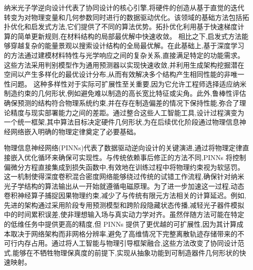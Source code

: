 纳米光子学逆向设计代表了协同设计的核心引擎,将硬件的创造从基于直觉的迭代转变为对物理变量和几何参数同时进行的数据驱动优化。该领域的基础方法包括拓扑优化和启发式方法,它们提供了不同的算法优势。拓扑优化利用基于快速梯度计算的简单更新规则,在材料结构的局部最优解中快速收敛。\citep{doi_10_1115_1_4065902_bf83da4b} \citep{doi_10_32604_cmes_2024_052620_6f4a92ee} 相比之下,启发式方法能够穿越复杂的能量景观以搜索设计结构的全局最优解。在此基础上,基于深度学习的方法通过建模材料特性与光学响应之间的复杂关系,直接满足特定的功能需求。这些方法采用判别模型作为通用预测器以实现快速收敛,并利用生成架构挖掘潜在空间以产生多样化的最优设计分布,从而有效解决多个结构产生相同性能的非唯一性问题。\citep{doi_10_1364_cleo_at_2024_jth2a_48_87abd6b5} 这种多样性对于实际可扩展性至关重要,因为它允许工程师选择适应纳米制造约束的几何形状,例如避免难以制造的高长宽比特征或尖角。此外,鲁棒性评估确保预测的结构符合物理系统约束,并在存在制造偏差的情况下保持性能,弥合了理论精度与现实部署能力之间的差距。通过整合这些人工智能工具,设计过程演变为一个统一框架,其中算法目标决定硬件几何形状,为在后续优化阶段通过物理信息神经网络嵌入明确的物理定律奠定了必要基础。\citep{doi_10_1515_nanoph_2021_0660_2d91a441} \citep{doi_10_29026_oes_2022_210012_27973a69}

物理信息神经网络(PINNs)代表了数据驱动逆向设计的关键演进,通过将物理定律直接嵌入优化循环来确保可实现性。与传统依赖事后修正的方法不同,PINNs 将控制偏微分方程直接集成到损失函数中,有效地在训练过程中将物理约束视为软惩罚。\citep{doi_10_1007_s10444_023_10065_9_12bf0652} \citep{s2_cc39d5405a933620426d86298fa8fe4cd51915c5_27626ee3} 这一机制使得深度卷积混合密度网络能够绕过传统的试错工作流程,确保针对纳米光子学结构的算法输出从一开始就遵循电磁原理。为了进一步加速这一过程,动态卷积神经算子捕捉因果物理约束,减少了与传统有限元方法相关的计算延迟。例如,先进的架构通过采用阶段专用预测模型和跨阶段隐藏状态传播,减轻光子器件模拟中的时间累积误差,使非理想输入场与真实动力学对齐。虽然伴随方法可能在特定的低维任务中提供更高的精度,但 PINNs 提供了更优越的可扩展性,因为其计算成本取决于网络架构而非网格分辨率,避免了高维情况下完整离散轨迹存储带来的不可行内存占用。通过将人工智能与物理引导框架融合,这些方法改变了协同设计范式,能够在不牺牲物理保真度的前提下,实现从抽象功能到可制造器件几何形状的快速映射。\citep{doi_10_48550_arxiv_2406_17810_813bd2a3} \citep{s2_037e66f37189104d61c0d000de0cee202b7eec9e_d15b8018} \citep{doi_10_48550_arxiv_2606_12337_68b62bfa}

